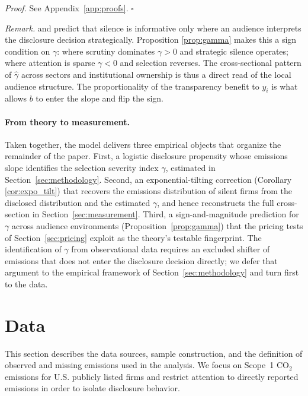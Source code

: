 \documentclass[a4paper,12pt]{article}
\newcommand{\citet}[1]{\textcite{#1}}
\begin{document}
\textit{Proof.} See Appendix~\ref{app:proofs}. \hfill $\square$

\textit{Remark.} \citet{milgrom1981good} and \citet{verrecchia1983discretionary} predict that silence is informative only where an audience interprets the disclosure decision strategically. Proposition \ref{prop:gamma} makes this a sign condition on $\gamma$: where scrutiny dominates $\gamma >0$ and strategic silence operates; where attention is sparse $\gamma <0$ and selection reverses. The cross-sectional pattern of $\hat{\gamma}$ across sectors and institutional ownership is thus a direct read of the local audience structure. The proportionality of the transparency benefit to $y_i$ is what allows $b$ to enter the slope and flip the sign.


\paragraph{From theory to measurement.} Taken together, the model delivers three empirical objects that organize the remainder of the paper. First, a logistic disclosure propensity whose emissions slope identifies the selection severity index $\gamma$, estimated in Section~\ref{sec:methodology}. Second, an exponential-tilting correction (Corollary \ref{cor:expo_tilt}) that recovers the emissions distribution of silent firms from the disclosed distribution and the estimated $\gamma$, and hence reconstructs the full cross-section in Section~\ref{sec:measurement}. Third, a sign-and-magnitude prediction for $\gamma$ across audience environments (Proposition~\ref{prop:gamma}) that the pricing tests of Section~\ref{sec:pricing} exploit as the theory's testable fingerprint. The identification of $\gamma$ from observational data requires an excluded shifter of emissions that does not enter the disclosure decision directly; we defer that argument to the empirical framework of Section~\ref{sec:methodology} and turn first to the data.

\section{Data}
\label{sec:data}

This section describes the data sources, sample construction, and the definition of observed and missing emissions used in the analysis. We focus on Scope~1 CO$_2$ emissions for U.S. publicly listed firms and restrict attention to directly reported emissions in order to isolate disclosure behavior.
\end{document}
